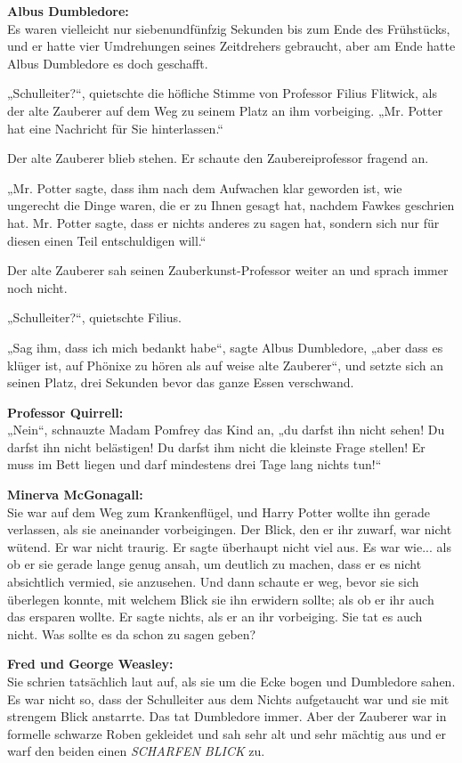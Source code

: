 {\textbf{Albus Dumbledore:}\\ Es waren vielleicht nur siebenundfünfzig Sekunden bis zum Ende des Frühstücks, und er hatte vier Umdrehungen seines Zeitdrehers gebraucht, aber am Ende hatte Albus Dumbledore es doch geschafft.

„Schulleiter?“, quietschte die höfliche Stimme von Professor Filius Flitwick, als der alte Zauberer auf dem Weg zu seinem Platz an ihm vorbeiging. „Mr. Potter hat eine Nachricht für Sie hinterlassen.“

Der alte Zauberer blieb stehen. Er schaute den Zaubereiprofessor fragend an.

„Mr. Potter sagte, dass ihm nach dem Aufwachen klar geworden ist, wie ungerecht die Dinge waren, die er zu Ihnen gesagt hat, nachdem Fawkes geschrien hat. Mr. Potter sagte, dass er nichts anderes zu sagen hat, sondern sich nur für diesen einen Teil entschuldigen will.“

Der alte Zauberer sah seinen Zauberkunst-Professor weiter an und sprach immer noch nicht.

„Schulleiter?“, quietschte Filius.

„Sag ihm, dass ich mich bedankt habe“, sagte Albus Dumbledore, „aber dass es klüger ist, auf Phönixe zu hören als auf weise alte Zauberer“, und setzte sich an seinen Platz, drei Sekunden bevor das ganze Essen verschwand.

\textbf{Professor Quirrell:}\\ „Nein“, schnauzte Madam Pomfrey das Kind an, „du darfst ihn nicht sehen! Du darfst ihn nicht belästigen! Du darfst ihm nicht die kleinste Frage stellen! Er muss im Bett liegen und darf mindestens drei Tage lang nichts tun!“

\textbf{Minerva McGonagall:}\\ Sie war auf dem Weg zum Krankenflügel, und Harry Potter wollte ihn gerade verlassen, als sie aneinander vorbeigingen. Der Blick, den er ihr zuwarf, war nicht wütend. Er war nicht traurig. Er sagte überhaupt nicht viel aus. Es war wie... als ob er sie gerade lange genug ansah, um deutlich zu machen, dass er es nicht absichtlich vermied, sie anzusehen. Und dann schaute er weg, bevor sie sich überlegen konnte, mit welchem Blick sie ihn erwidern sollte; als ob er ihr auch das ersparen wollte. Er sagte nichts, als er an ihr vorbeiging. Sie tat es auch nicht. Was sollte es da schon zu sagen geben?

\textbf{Fred und George Weasley:}\\ Sie schrien tatsächlich laut auf, als sie um die Ecke bogen und Dumbledore sahen. Es war nicht so, dass der Schulleiter aus dem Nichts aufgetaucht war und sie mit strengem Blick anstarrte. Das tat Dumbledore immer. Aber der Zauberer war in formelle schwarze Roben gekleidet und sah sehr alt und sehr mächtig aus und er warf den beiden einen \emph{SCHARFEN BLICK} zu.

}
